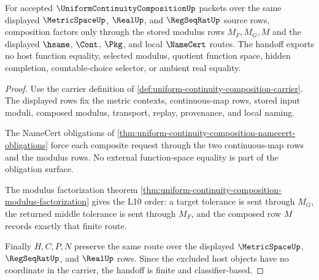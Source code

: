 \begin{theorem}
\label{thm:uniform-continuity-composition-l10-handoff}
For accepted $\UniformContinuityCompositionUp$ packets over the same displayed $\MetricSpaceUp$, $\RealUp$, and $\RegSeqRatUp$ source rows, composition factors only through the stored modulus rows $M_F,M_G,M$ and the displayed $\hsame$, $\Cont$, $\Pkg$, and local $\NameCert$ routes. The handoff exports no host function equality, selected modulus, quotient function space, hidden completion, countable-choice selector, or ambient real equality.
\end{theorem}
\begin{proof}
Use the carrier definition of \autoref{def:uniform-continuity-composition-carrier}. The displayed rows fix the metric contexts, continuous-map rows, stored input moduli, composed modulus, transport, replay, provenance, and local naming.

The NameCert obligations of \autoref{thm:uniform-continuity-composition-namecert-obligations} force each composite request through the two continuous-map rows and the modulus rows. No external function-space equality is part of the obligation surface.

The modulus factorization theorem \autoref{thm:uniform-continuity-composition-modulus-factorization} gives the L10 order: a target tolerance is sent through $M_G$, the returned middle tolerance is sent through $M_F$, and the composed row $M$ records exactly that finite route.

Finally $H,C,P,N$ preserve the same route over the displayed $\MetricSpaceUp$, $\RegSeqRatUp$, and $\RealUp$ rows. Since the excluded host objects have no coordinate in the carrier, the handoff is finite and classifier-based.
\end{proof}

